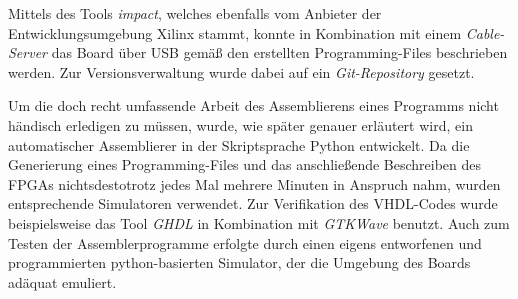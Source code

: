 Mittels des Tools \textit{impact}, welches ebenfalls vom Anbieter der
Entwicklungsumgebung Xilinx stammt, konnte in Kombination mit einem
\textit{Cable-Server} das Board \"uber USB gem\"a{\ss} den erstellten
Programming-Files beschrieben werden. Zur Versionsverwaltung wurde dabei
auf ein \textit{Git-Repository} gesetzt.

Um die doch recht umfassende Arbeit des Assemblierens eines Programms nicht
h\"andisch erledigen zu m\"ussen, wurde, wie sp\"ater genauer erl\"autert wird,
ein automatischer Assemblierer in der Skriptsprache Python entwickelt. Da die
Generierung eines Programming-Files und das anschlie\ss{}ende Beschreiben des
FPGAs nichtsdestotrotz jedes Mal mehrere Minuten in Anspruch nahm,
wurden entsprechende Simulatoren verwendet. Zur Verifikation des VHDL-Codes
wurde beispielsweise das Tool \textit{GHDL} in Kombination mit \textit{GTKWave}
benutzt. Auch zum Testen der Assemblerprogramme erfolgte durch einen eigens entworfenen und programmierten python-basierten Simulator, der die Umgebung des Boards ad\"aquat emuliert.

\newpage
